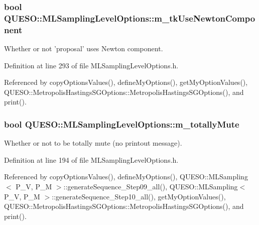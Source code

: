 \hypertarget{class_q_u_e_s_o_1_1_m_l_sampling_level_options_aa763d458ffbb83ea5be881e9535a2cb5}{
\subsubsection[{m\-\_\-tk\-Use\-Newton\-Component}]{\setlength{\rightskip}{0pt plus 5cm}bool Q\-U\-E\-S\-O\-::\-M\-L\-Sampling\-Level\-Options\-::m\-\_\-tk\-Use\-Newton\-Component}}\label{class_q_u_e_s_o_1_1_m_l_sampling_level_options_aa763d458ffbb83ea5be881e9535a2cb5}


Whether or not 'proposal' uses Newton component. 



Definition at line 293 of file M\-L\-Sampling\-Level\-Options.\-h.



Referenced by copy\-Options\-Values(), define\-My\-Options(), get\-My\-Option\-Values(), Q\-U\-E\-S\-O\-::\-Metropolis\-Hastings\-S\-G\-Options\-::\-Metropolis\-Hastings\-S\-G\-Options(), and print().

\hypertarget{class_q_u_e_s_o_1_1_m_l_sampling_level_options_aeb5b3d634be08ac24bdc008ecfbf08b6}{
\subsubsection[{m\-\_\-totally\-Mute}]{\setlength{\rightskip}{0pt plus 5cm}bool Q\-U\-E\-S\-O\-::\-M\-L\-Sampling\-Level\-Options\-::m\-\_\-totally\-Mute}}\label{class_q_u_e_s_o_1_1_m_l_sampling_level_options_aeb5b3d634be08ac24bdc008ecfbf08b6}


Whether or not to be totally mute (no printout message). 



Definition at line 194 of file M\-L\-Sampling\-Level\-Options.\-h.



Referenced by copy\-Options\-Values(), define\-My\-Options(), Q\-U\-E\-S\-O\-::\-M\-L\-Sampling$<$ P\-\_\-\-V, P\-\_\-\-M $>$\-::generate\-Sequence\-\_\-\-Step09\-\_\-all(), Q\-U\-E\-S\-O\-::\-M\-L\-Sampling$<$ P\-\_\-\-V, P\-\_\-\-M $>$\-::generate\-Sequence\-\_\-\-Step10\-\_\-all(), get\-My\-Option\-Values(), Q\-U\-E\-S\-O\-::\-Metropolis\-Hastings\-S\-G\-Options\-::\-Metropolis\-Hastings\-S\-G\-Options(), and print().



